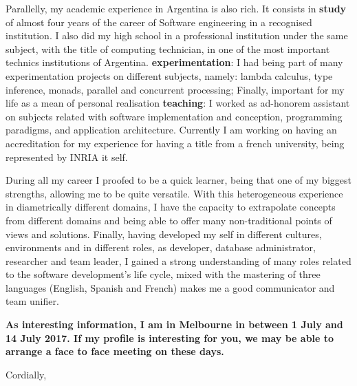 \documentclass[11pt]{letter} %
\begin{document}
\begin{letter}{}
Parallelly, my academic experience in Argentina is also rich. It consists in \textbf{study} of almost four years of the career of Software engineering in a recognised institution. I also did my high school in a professional institution under the same subject, with the title of computing technician, in one of the most important technics institutions of Argentina. 
\textbf{experimentation}: I had being part of many experimentation projects on different subjects, namely: lambda calculus, type inference, monads, parallel and concurrent processing;  Finally, important for my life as a mean of personal realisation \textbf{teaching}: I worked as ad-honorem assistant on subjects related with software implementation and conception, programming paradigms, and application architecture. Currently I am working on having an accreditation for my experience for having a title from a french university, being represented by INRIA it self.

During all my career I proofed to be a quick learner, being that one of my biggest strengths, allowing me to be quite versatile.  With this heterogeneous experience in diametrically different domains, I have the capacity to extrapolate concepts from different domains and being able to offer  many non-traditional points of views and solutions. Finally, having developed my self in different cultures, environments and in different roles, as developer, database administrator, researcher and team leader, I gained a strong understanding of many roles related to the software development's life cycle, mixed with the mastering of three languages (English, Spanish and French) makes me a good communicator and team unifier. 



 \textbf{As interesting information, I am in Melbourne in between 1 July and 14 July 2017. If my profile is interesting for you, we may be able to arrange a face to face meeting on these days. }
 


\closing{Cordially,}




\end{letter}
\end{document}
